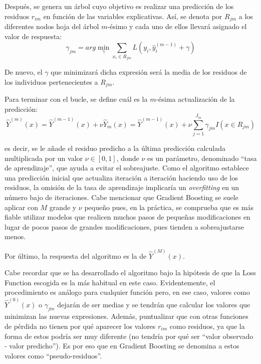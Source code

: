 \documentclass[12pt,twoside]{article}
\begin{document}
Después, se genera un árbol cuyo objetivo es realizar una predicción de los residuos $r_{im}$ en función de las variables explicativas. Así, se denota por $R_{jm}$ a los diferentes nodos hoja del árbol $m$-ésimo y cada uno de ellos llevará asignado el valor de respuesta:
\begin{equation*}
\gamma_{jm} = arg\min_{\gamma} \sum_{x_i \in R_{jm}} L(y_i, \hat{y}_i^{(m-1)} + \gamma)
\end{equation*}

De nuevo, el $\gamma$ que minimizará dicha expresión será la media de los residuos de los individuos pertenecientes a $R_{jm}$. 

Para terminar con el bucle, se define cuál es la $m$-ésima actualización de la predicción:
\begin{equation*}
\hat{Y}^{(m)}(x) = \hat{Y}^{(m-1)}(x) + \nu \hat{Y}_m(x) = \hat{Y}^{(m-1)}(x) + \nu \sum_{j = 1}^{J_m}\gamma_{jm} I(x \in R_{jm})
\end{equation*}

\noindent
es decir, se le añade el residuo predicho a la última predicción calculada multiplicada por un valor $\nu \in [0, 1]$, donde $\nu$ es un parámetro, denominado ``tasa de aprendizaje'', que ayuda a evitar el sobreajuste. Como el algoritmo establece una predicción inicial que actualiza iteración a iteración haciendo uso de los residuos, la omisión de la tasa de aprendizaje implicaría un \textit{overfitting} en un número bajo de iteraciones. Cabe mencionar que Gradient Boosting se suele aplicar con $M$ grande y $\nu$ pequeño pues, en la práctica, se comprueba que es más fiable utilizar modelos que realicen muchos pasos de pequeñas modificaciones en lugar de pocos pasos de grandes modificaciones, pues tienden a sobreajustarse menos.

Por último, la respuesta del algoritmo es la de $\hat{Y}^{(M)}(x)$.

Cabe recordar que se ha desarrollado el algoritmo bajo la hipótesis de que la Loss Function escogida es la más habitual en este caso. Evidentemente, el procedimiento es análogo para cualquier función pero, en ese caso, valores como $\hat{Y}^{(0)}(x)$ o $\gamma_{jm}$ dejarán de ser medias y se tendrán que calcular los valores que minimizan las nuevas expresiones. Además, puntualizar que con otras funciones de pérdida no tienen por qué aparecer los valores $r_{im}$ como residuos, ya que la forma de estos podría ser muy diferente (no tendría por qué ser ``valor observado - valor predicho''). Es por eso que en Gradient Boosting se denomina a estos valores como ``pseudo-residuos''.
\end{document}
